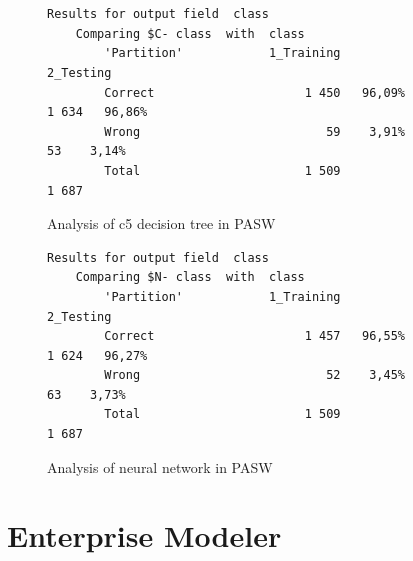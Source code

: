 \documentclass[11pt]{article}
\begin{document}
\mbox{}\\
\begin{table}[h]
\caption{Error matrix for c5 decision tree in PASW}
\label{tab:c5_pasw}
\end{table}


\mbox{}\\
\begin{table}[h]
\caption{Error matrix for neural network in PASW}
\label{tab:neural_pasw}
\end{table}


\begin{figure}[!ht]
	\centering
\begin{verbatim}
Results for output field  class 
	Comparing $C- class  with  class 
		'Partition'            1_Training            2_Testing         
		Correct                     1 450   96,09%       1 634   96,86%
		Wrong                          59    3,91%          53    3,14%
		Total                       1 509                1 687
\end{verbatim}
\caption{Analysis of c5 decision tree in PASW}
\end{figure}


\begin{figure}[!ht]
	\centering
\begin{verbatim}
Results for output field  class 
	Comparing $N- class  with  class 
		'Partition'            1_Training            2_Testing         
		Correct                     1 457   96,55%       1 624   96,27%
		Wrong                          52    3,45%          63    3,73%
		Total                       1 509                1 687         
\end{verbatim}
\caption{Analysis of neural network in PASW}
\end{figure}


\clearpage


\section{Enterprise Modeler}



\clearpage


\end{document}
